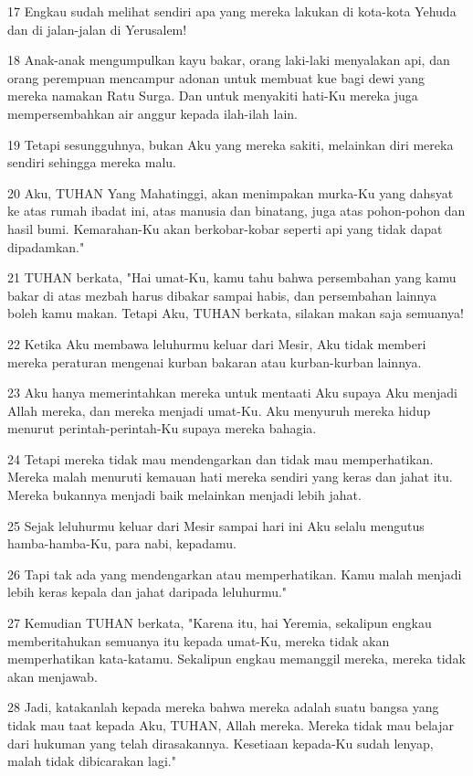 \par 17 Engkau sudah melihat sendiri apa yang mereka lakukan di kota-kota Yehuda dan di jalan-jalan di Yerusalem!
\par 18 Anak-anak mengumpulkan kayu bakar, orang laki-laki menyalakan api, dan orang perempuan mencampur adonan untuk membuat kue bagi dewi yang mereka namakan Ratu Surga. Dan untuk menyakiti hati-Ku mereka juga mempersembahkan air anggur kepada ilah-ilah lain.
\par 19 Tetapi sesungguhnya, bukan Aku yang mereka sakiti, melainkan diri mereka sendiri sehingga mereka malu.
\par 20 Aku, TUHAN Yang Mahatinggi, akan menimpakan murka-Ku yang dahsyat ke atas rumah ibadat ini, atas manusia dan binatang, juga atas pohon-pohon dan hasil bumi. Kemarahan-Ku akan berkobar-kobar seperti api yang tidak dapat dipadamkan."
\par 21 TUHAN berkata, "Hai umat-Ku, kamu tahu bahwa persembahan yang kamu bakar di atas mezbah harus dibakar sampai habis, dan persembahan lainnya boleh kamu makan. Tetapi Aku, TUHAN berkata, silakan makan saja semuanya!
\par 22 Ketika Aku membawa leluhurmu keluar dari Mesir, Aku tidak memberi mereka peraturan mengenai kurban bakaran atau kurban-kurban lainnya.
\par 23 Aku hanya memerintahkan mereka untuk mentaati Aku supaya Aku menjadi Allah mereka, dan mereka menjadi umat-Ku. Aku menyuruh mereka hidup menurut perintah-perintah-Ku supaya mereka bahagia.
\par 24 Tetapi mereka tidak mau mendengarkan dan tidak mau memperhatikan. Mereka malah menuruti kemauan hati mereka sendiri yang keras dan jahat itu. Mereka bukannya menjadi baik melainkan menjadi lebih jahat.
\par 25 Sejak leluhurmu keluar dari Mesir sampai hari ini Aku selalu mengutus hamba-hamba-Ku, para nabi, kepadamu.
\par 26 Tapi tak ada yang mendengarkan atau memperhatikan. Kamu malah menjadi lebih keras kepala dan jahat daripada leluhurmu."
\par 27 Kemudian TUHAN berkata, "Karena itu, hai Yeremia, sekalipun engkau memberitahukan semuanya itu kepada umat-Ku, mereka tidak akan memperhatikan kata-katamu. Sekalipun engkau memanggil mereka, mereka tidak akan menjawab.
\par 28 Jadi, katakanlah kepada mereka bahwa mereka adalah suatu bangsa yang tidak mau taat kepada Aku, TUHAN, Allah mereka. Mereka tidak mau belajar dari hukuman yang telah dirasakannya. Kesetiaan kepada-Ku sudah lenyap, malah tidak dibicarakan lagi."

